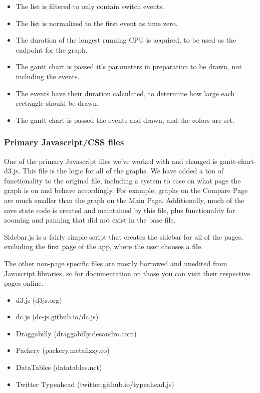 \documentclass{hmcclinic}
\begin{document}
  \begin{itemize}

    \item The list is filtered to only contain switch
  events. 
  
    \item The list is normalized to the first event as time zero. 
  
    \item The duration of the longest running CPU is acquired, to be used as the endpoint
  for the graph. 
  
    \item The gantt chart is passed it's parameters in preparation to be
  drawn, not including the events. 
  
   \item The events have their duration calculated, to
  determine how large each rectangle should be drawn.
  
   \item The gantt chart is passed the events and drawn, and the colors are set.

  \end{itemize}
  \subsubsection{Primary Javascript/CSS files}
  One of the primary Javascript files we've worked
  with and changed is gantt-chart-d3.js. This file is the logic for all of the
  graphs. We have added a ton of functionality to the original file, including a
  system to case on what page the graph is on and behave accordingly. For
  example, graphs on the Compare Page are much smaller than the graph on the
  Main Page. Additionally, much of the save state code is created and maintained
  by this file, plus functionality for zooming and panning that did not exist in
  the base file.

  Sidebar.js is a fairly simple script that creates the sidebar for all of the
  pages, excluding the first page of the app, where the user chooses a file.

  The other non-page specific files are mostly borrowed and unedited from
  Javascript libraries, so for documentation on those you can visit their
  respective pages online.
\begin{itemize}
\item d3.js (d3js.org)
\item dc.js (dc-js.github.io/dc.js)
\item Draggabilly (draggabilly.desandro.com)
\item Packery (packery.metafizzy.co)
\item DataTables (datatables.net)
\item Twitter Typeahead (twitter.github.io/typeahead.js)

\end{itemize}
\end{document}
